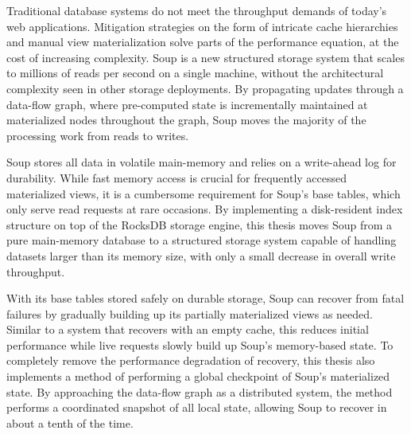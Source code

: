Traditional database systems do not meet the throughput demands of today's web
applications. Mitigation strategies on the form of intricate cache hierarchies
and manual view materialization solve parts of the performance equation, at the
cost of increasing complexity. Soup is a new structured storage system that
scales to millions of reads per second on a single machine, without the
architectural complexity seen in other storage deployments. By propagating
updates through a data-flow graph, where pre-computed state is incrementally
maintained at materialized nodes throughout the graph, Soup moves the majority
of the processing work from reads to writes.

Soup stores all data in volatile main-memory and relies on a write-ahead log for
durability. While fast memory access is crucial for frequently accessed
materialized views, it is a cumbersome requirement for Soup's base tables, which
only serve read requests at rare occasions. By implementing a disk-resident
index structure on top of the RocksDB storage engine, this thesis moves Soup
from a pure main-memory database to a structured storage system capable of
handling datasets larger than its memory size, with only a small decrease in
overall write throughput.

With its base tables stored safely on durable storage, Soup can recover from
fatal failures by gradually building up its partially materialized views as
needed. Similar to a system that recovers with an empty cache, this reduces
initial performance while live requests slowly build up Soup's memory-based
state. To completely remove the performance degradation of recovery, this thesis
also implements a method of performing a global checkpoint of Soup's
materialized state. By approaching the data-flow graph as a distributed system,
the method performs a coordinated snapshot of all local state, allowing Soup to
recover in about a tenth of the time.

